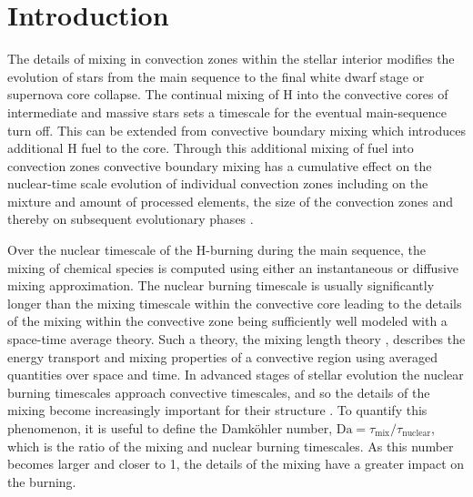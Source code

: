 \documentclass[fleqn,usenatbib]{mnras}
\begin{document}


\section{Introduction}

The details of mixing in convection zones within the stellar interior
modifies the evolution of stars from the main sequence to the final
white dwarf stage or supernova core collapse. The continual mixing of
H into the convective cores of intermediate and massive stars sets a
timescale for the eventual main-sequence turn off. This can be
extended from convective boundary mixing which introduces additional H
fuel to the core. Through this additional mixing of fuel into
convection zones convective boundary mixing has a cumulative effect on
the nuclear-time scale evolution of individual convection zones
including on the mixture and amount of processed elements, the size of
the convection zones and thereby on subsequent evolutionary phases
\citep[for
  example][]{herwig:00c,Young:2005eg,Denissenkov:2012cu,Battino:2016bna,Davis2019,Wagstaff:2020ce}.


Over the nuclear timescale of the H-burning during the main sequence,
the mixing of chemical species is computed using either an
instantaneous or diffusive mixing approximation. The nuclear burning
timescale is usually significantly longer than the mixing timescale
within the convective core leading to the details of the mixing within
the convective zone being sufficiently well modeled with a space-time
average theory. Such a theory, the mixing length theory
\citep[MLT][]{cox:68}, describes the energy transport and mixing
properties of a convective region using averaged quantities over space
and time.  In advanced stages of stellar evolution the nuclear burning
timescales approach convective timescales, and so the details of the
mixing become increasingly important for their structure
\citep[][]{Herwig2011,Collins:2018cp,Cote:2020bo}.  To quantify this
phenomenon, it is useful to define the Damk\"ohler number,
$\mathrm{Da} = \tau_{\mathrm{mix}} / \tau_{\mathrm{nuclear}}$, which
is the ratio of the mixing and nuclear burning timescales. As this
number becomes larger and closer to 1, the details of the mixing have
a greater impact on the burning.
\end{document}
